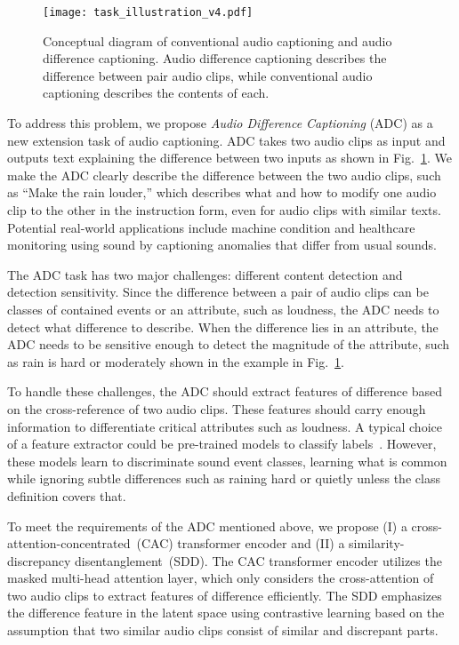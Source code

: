 \begin{figure}[t]
  \centering
\texttt{[image: task\_illustration\_v4.pdf]} 
\vspace{-5pt}
  \caption{
  Conceptual diagram of conventional audio captioning and audio difference captioning.
  Audio difference captioning describes the difference between pair audio clips, while conventional audio captioning describes the contents of each. 
  }
  \label{fig:task_illust}
  \vspace{-10pt}
\end{figure}

To address this problem, we propose \textit{Audio Difference Captioning} (ADC) as a new extension task of audio captioning. 
ADC takes two audio clips as input and outputs text explaining the difference between two inputs as shown in Fig.~\ref{fig:task_illust}. 
We make the ADC clearly describe the difference between the two audio clips,
such as ``Make the rain louder,'' which describes what and how to modify one audio clip to the other in the instruction form, even for audio clips with similar texts. 
Potential real-world applications include machine condition and healthcare monitoring using sound by captioning anomalies that differ from usual sounds.

The ADC task has two major challenges: different content detection and detection sensitivity. 
Since the difference between a pair of audio clips can be classes of contained events or an attribute, such as loudness, the ADC needs to detect what difference to describe. 
When the difference lies in an attribute, the ADC needs to be sensitive enough to detect the magnitude of the attribute, such as rain is hard or moderately shown in the example in Fig.~\ref{fig:task_illust}.

To handle these challenges, the ADC should extract features of difference based on the cross-reference of two audio clips. 
These features should carry enough information to differentiate critical attributes such as loudness. 
A typical choice of a feature extractor could be pre-trained models to classify labels~\cite{hershey2017cnn, kong2020panns, gong2021ast}. However, these models learn to discriminate sound event classes, learning what is common while ignoring subtle differences such as raining hard or quietly unless the class definition covers that.

To meet the requirements of the ADC mentioned above, we propose (I) a cross-attention-concentrated~(CAC) transformer encoder and (II) a similarity-discrepancy disentanglement~(SDD). 
The CAC transformer encoder utilizes the masked multi-head attention layer, which only considers the cross-attention of two audio clips to extract features of difference efficiently. 
The SDD emphasizes the difference feature in the latent space using contrastive learning based on the assumption that two similar audio clips consist of similar and discrepant parts.


